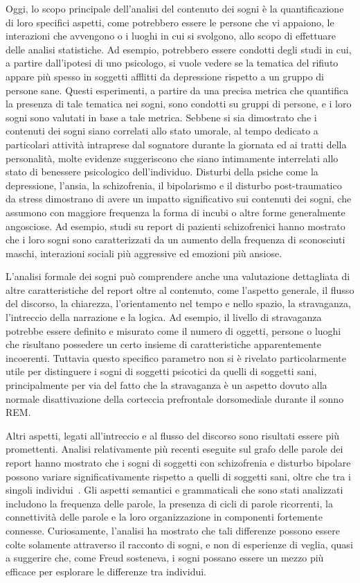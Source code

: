 Oggi, lo scopo principale dell'analisi del contenuto dei sogni è la quantificazione di loro specifici aspetti,
come potrebbero essere le persone che vi appaiono, le interazioni che avvengono o i luoghi in cui si svolgono,
allo scopo di effettuare delle analisi statistiche.
Ad esempio, potrebbero essere condotti degli studi in cui, a partire dall'ipotesi di uno psicologo, si vuole
vedere se la tematica del rifiuto appare più spesso in soggetti afflitti da depressione rispetto a un gruppo
di persone sane.
Questi esperimenti, a partire da una precisa metrica che quantifica la presenza di tale tematica nei
sogni, sono condotti su gruppi di persone, e i loro sogni sono valutati in base a tale metrica.
Sebbene si sia dimostrato che i contenuti dei sogni siano correlati allo stato umorale, al tempo
dedicato a particolari attività intraprese dal sognatore durante la giornata ed ai tratti della personalità,
molte evidenze suggeriscono che siano intimamente interrelati allo stato di benessere psicologico dell'individuo.
Disturbi della psiche come la depressione, l'ansia, la schizofrenia, il bipolarismo e
il disturbo post-traumatico da stress dimostrano di avere un impatto significativo sui contenuti dei sogni,
che assumono con maggiore frequenza la forma di incubi o altre forme generalmente angosciose.
Ad esempio, studi su report di pazienti schizofrenici hanno mostrato che i loro sogni sono
caratterizzati da un aumento della frequenza di sconosciuti maschi, interazioni sociali più aggressive ed
emozioni più ansiose. %

L'analisi formale dei sogni può comprendere anche una valutazione dettagliata di altre caratteristiche del report
oltre al contenuto, come l'aspetto generale, il flusso del discorso, la chiarezza, l'orientamento nel tempo e
nello spazio, la stravaganza, l'intreccio della narrazione e la logica.
Ad esempio, il livello di stravaganza potrebbe essere definito e misurato come il numero di oggetti, persone o
luoghi che risultano possedere un certo insieme di caratteristiche apparentemente incoerenti.
Tuttavia questo specifico parametro non si è rivelato particolarmente utile per distinguere i sogni di
soggetti psicotici da quelli di soggetti sani, principalmente per via del fatto che la stravaganza è un aspetto
dovuto alla normale disattivazione della corteccia prefrontale dorsomediale durante il sonno REM.

Altri aspetti, legati all'intreccio e al flusso del discorso sono risultati essere più promettenti.
Analisi relativamente più recenti eseguite sul grafo delle parole dei report hanno mostrato che i sogni di soggetti con
schizofrenia e disturbo bipolare possono variare significativamente rispetto a quelli di soggetti sani,
oltre che tra i singoli individui~\cite{mota2014graph}.
Gli aspetti semantici e grammaticali che sono stati analizzati includono la frequenza delle parole, la presenza di
cicli di parole ricorrenti, la connettività delle parole e la loro organizzazione in componenti
fortemente connesse.
Curiosamente, l'analisi ha mostrato che tali differenze possono essere colte solamente attraverso il racconto di
sogni, e non di esperienze di veglia, quasi a suggerire che, come Freud sosteneva, i sogni possano essere un mezzo più
efficace per esplorare le differenze tra individui.